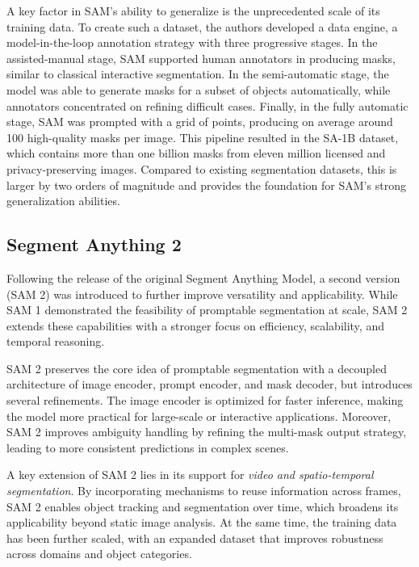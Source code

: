 A key factor in SAM’s ability to generalize is the unprecedented scale of its training data. To create such a dataset, the authors developed a data engine, a model-in-the-loop annotation strategy with three progressive stages. In the assisted-manual stage, SAM supported human annotators in producing masks, similar to classical interactive segmentation. In the semi-automatic stage, the model was able to generate masks for a subset of objects automatically, while annotators concentrated on refining difficult cases. Finally, in the fully automatic stage, SAM was prompted with a grid of points, producing on average around 100 high-quality masks per image. This pipeline resulted in the SA-1B dataset, which contains more than one billion masks from eleven million licensed and privacy-preserving images. Compared to existing segmentation datasets, this is larger by two orders of magnitude and provides the foundation for SAM’s strong generalization abilities. 


\subsection{Segment Anything 2}

Following the release of the original Segment Anything Model, a second version (SAM 2) \cite{ravi2024sam2segmentimages} was introduced to further improve versatility and applicability. While SAM 1 demonstrated the feasibility of promptable segmentation at scale, SAM 2 extends these capabilities with a stronger focus on efficiency, scalability, and temporal reasoning. 

SAM 2 preserves the core idea of promptable segmentation with a decoupled architecture of image encoder, prompt encoder, and mask decoder, but introduces several refinements. The image encoder is optimized for faster inference, making the model more practical for large-scale or interactive applications. Moreover, SAM 2 improves ambiguity handling by refining the multi-mask output strategy, leading to more consistent predictions in complex scenes. 

A key extension of SAM 2 lies in its support for \textit{video and spatio-temporal segmentation}. By incorporating mechanisms to reuse information across frames, SAM 2 enables object tracking and segmentation over time, which broadens its applicability beyond static image analysis. At the same time, the training data has been further scaled, with an expanded dataset that improves robustness across domains and object categories. 


